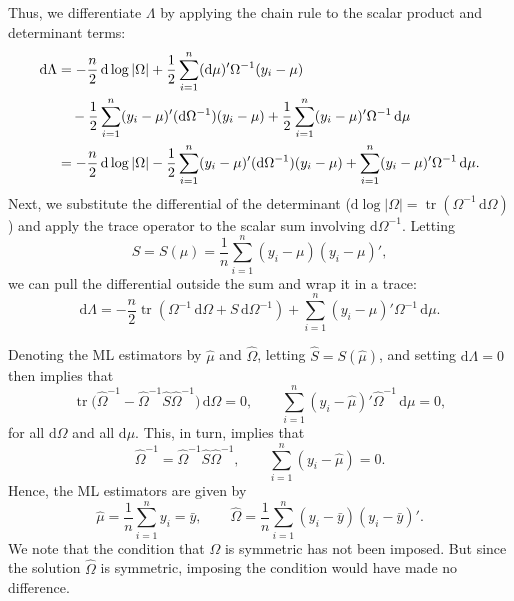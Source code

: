 \documentclass[12pt,a4paper]{article}
\theoremstyle{definition}
\DeclareMathOperator{\tr}{tr}
\newcommand{\dd}{\mathrm{d}}
\begin{document}
Thus, we differentiate $\Lambda$ by applying the chain rule to the scalar product and determinant terms:
\begin{align}\label{eq:44_step1}
\dd\Lambda &= -\frac{n}{2}\, \dd\log|\Omega| + \frac{1}{2}\sum_{i=1}^{n}(\dd\mu)'\Omega^{-1}(y_i - \mu) \notag \\
&\quad - \frac{1}{2}\sum_{i=1}^{n}(y_i - \mu)'(\dd\Omega^{-1})(y_i - \mu) + \frac{1}{2}\sum_{i=1}^{n}(y_i - \mu)'\Omega^{-1}\, \dd\mu \notag \\
&= -\frac{n}{2}\, \dd\log|\Omega| - \frac{1}{2}\sum_{i=1}^{n}(y_i - \mu)'(\dd\Omega^{-1})(y_i - \mu) + \sum_{i=1}^{n}(y_i - \mu)'\Omega^{-1}\, \dd\mu.
\end{align}
Next, we substitute the differential of the determinant ($\dd\log|\Omega| = \tr(\Omega^{-1}\, \dd\Omega)$) and apply the trace operator to the scalar sum involving $\dd\Omega^{-1}$. Letting
\[
S = S(\mu) = \frac{1}{n}\sum_{i=1}^{n}(y_i - \mu)(y_i - \mu)',
\]
we can pull the differential outside the sum and wrap it in a trace:
\begin{equation}\label{eq:44_step2}
\dd\Lambda = -\frac{n}{2}\tr(\Omega^{-1}\, \dd\Omega + S\, \dd\Omega^{-1}) + \sum_{i=1}^{n}(y_i - \mu)'\Omega^{-1}\, \dd\mu.
\end{equation}

Denoting the ML estimators by $\hat{\mu}$ and $\hat{\Omega}$, letting $\hat{S} = S(\hat{\mu})$, and setting $\dd\Lambda = 0$ then implies that
\[
\tr\bigl(\hat{\Omega}^{-1} - \hat{\Omega}^{-1}\hat{S}\hat{\Omega}^{-1}\bigr)\, \dd\Omega = 0, \qquad
\sum_{i=1}^{n}(y_i - \hat{\mu})'\hat{\Omega}^{-1}\, \dd\mu = 0,
\]
for all $\dd\Omega$ and all $\dd\mu$. This, in turn, implies that
\[
\hat{\Omega}^{-1} = \hat{\Omega}^{-1}\hat{S}\hat{\Omega}^{-1}, \qquad
\sum_{i=1}^{n}(y_i - \hat{\mu}) = 0.
\]
Hence, the ML estimators are given by
\begin{equation}\label{eq:45}
\hat{\mu} = \frac{1}{n}\sum_{i=1}^{n} y_i = \bar{y}, \qquad
\hat{\Omega} = \frac{1}{n}\sum_{i=1}^{n}(y_i - \bar{y})(y_i - \bar{y})'.
\end{equation}
We note that the condition that $\Omega$ is symmetric has not been imposed. But since the solution $\hat{\Omega}$ is symmetric, imposing the condition would have made no difference. %
\end{document}
